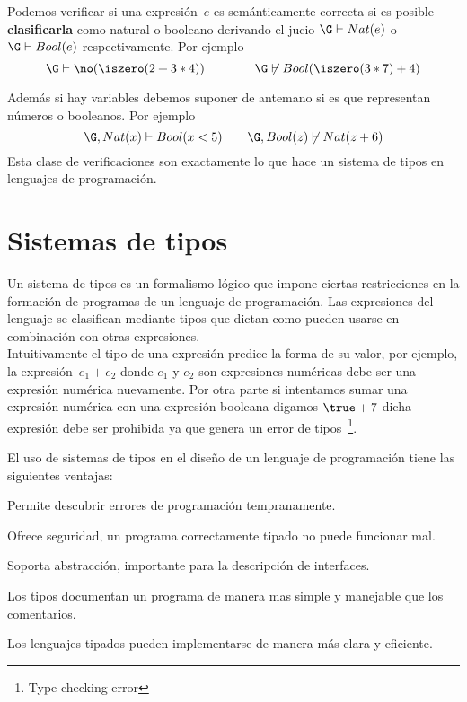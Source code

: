 \documentclass[11pt,letterpaper]{article}
\begin{document}
Podemos verificar si una expresión~$e$ es semánticamente correcta si es posible 
\textbf{clasificarla} como natural o booleano derivando el jucio 
$\G\vdash Nat(e)$ o $\G\vdash Bool(e)$ respectivamente. Por ejemplo
\[
\G\vdash \no (\iszero (2 + 3*4)) \qquad\qquad \G\not\vdash Bool(\iszero(3*7)+4)
\]

Además si hay variables debemos suponer de antemano si es que representan 
números o booleanos. Por ejemplo
\[
\G,Nat(x)\vdash Bool(x<5) \qquad \G,Bool(z)\not\vdash Nat(z+6)
\]
Esta clase de verificaciones son exactamente lo que hace un sistema de tipos en 
lenguajes de programación.


\section{Sistemas de tipos}

Un sistema de tipos es un formalismo lógico que impone ciertas restricciones en 
la formación de programas de un lenguaje de programación. Las expresiones del 
lenguaje se clasifican mediante tipos que dictan como pueden usarse en 
combinación con otras expresiones. \\
Intuitivamente el tipo de una expresión predice la forma de su valor, por 
ejemplo, la expresión~$e_1+e_2$ donde $e_1$ y $e_2$ son expresiones numéricas 
debe ser una expresión numérica nuevamente. Por otra parte si intentamos sumar 
una expresión numérica con una expresión booleana digamos $\true + 7$  dicha 
expresión debe ser prohibida ya que genera un error de 
tipos~\footnote{Type-checking error}.



El uso de sistemas de tipos en el diseño de un lenguaje de
programación tiene las siguientes ventajas:
\bi
\item Permite descubrir errores de programación tempranamente.
\item Ofrece seguridad, un programa correctamente tipado no puede funcionar mal.
\item Soporta abstracción, importante para la descripción de interfaces.
\item Los tipos documentan un programa de manera mas simple y
  manejable que los comentarios.
\item Los lenguajes tipados pueden implementarse de manera más clara y
  eficiente.
\ei
\end{document}

